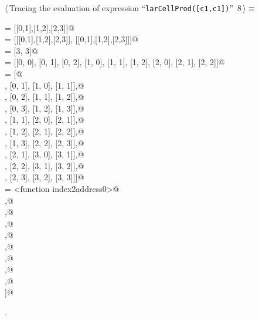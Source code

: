 \documentclass[11pt,oneside]{article}	%
\begin{document}
\begin{flushleft} \small \label{scrap10}
\protect{}$\langle\,$Tracing the evaluation of expression ``\texttt{larCellProd([c1,c1])}''\nobreak\ {\footnotesize 8}$\,\rangle\equiv$
\vspace{-1ex}
\begin{list}{}{} \item
\mbox{} = [[0,1],[1,2],[2,3]]@\\
\mbox{}\verb@cellLists = [[[0,1],[1,2],[2,3]], [[0,1],[1,2],[2,3]]]@\\
\mbox{}\verb@shapes = [3, 3]@\\
\mbox{}\verb@indices = [[0, 0], [0, 1], [0, 2], [1, 0], [1, 1], [1, 2], [2, 0], [2, 1], [2, 2]]@\\
\mbox{}\verb@jointCells = [@\\
\mbox{}\verb@ [[0, 0], [0, 1], [1, 0], [1, 1]],@\\
\mbox{}\verb@ [[0, 1], [0, 2], [1, 1], [1, 2]],@\\
\mbox{}\verb@ [[0, 2], [0, 3], [1, 2], [1, 3]],@\\
\mbox{}\verb@ [[1, 0], [1, 1], [2, 0], [2, 1]],@\\
\mbox{}\verb@ [[1, 1], [1, 2], [2, 1], [2, 2]],@\\
\mbox{}\verb@ [[1, 2], [1, 3], [2, 2], [2, 3]],@\\
\mbox{}\verb@ [[2, 0], [2, 1], [3, 0], [3, 1]],@\\
\mbox{}\verb@ [[2, 1], [2, 2], [3, 1], [3, 2]],@\\
\mbox{}\verb@ [[2, 2], [2, 3], [3, 2], [3, 3]]]@\\
\mbox{}\verb@convert = <function index2address0>@\\
\mbox{}\verb@return [@\\
\mbox{}\verb@ [0, 1, 4, 5],@\\
\mbox{}\verb@ [1, 2, 5, 6],@\\
\mbox{}\verb@ [2, 3, 6, 7],@\\
\mbox{}\verb@ [4, 5, 8, 9],@\\
\mbox{}\verb@ [5, 6, 9, 10],@\\
\mbox{}\verb@ [6, 7, 10, 11],@\\
\mbox{}\verb@ [8, 9, 12, 13],@\\
\mbox{}\verb@ [9, 10, 13, 14],@\\
\mbox{}\verb@ [10, 11, 14, 15]]@\\
\mbox{}\verb@@{\NWsep}
\end{list}
\vspace{-1ex}
\footnotesize\addtolength{\baselineskip}{-1ex}
\begin{list}{}{\setlength{\itemsep}{-\parsep}\setlength{\itemindent}{-\leftmargin}}
\item {\NWtxtMacroNoRef}.
\end{list}
\end{flushleft}
\end{document}
